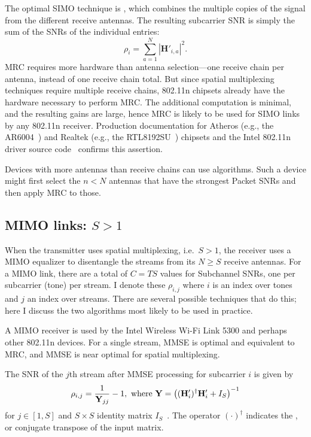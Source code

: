 The optimal SIMO technique is , which combines the multiple copies of the signal from the different receive antennas. The resulting subcarrier SNR is simply the sum of the SNRs of the individual entries:
\begin{equation}
	\label{eq:mrc}
	\rho_i = \sum_{a=1}^N \left| \mathbf{H}'_{i,a} \right|^2.
\end{equation}
MRC requires more hardware than antenna selection---one receive chain per antenna, instead of one receive chain total. But since spatial multiplexing techniques require multiple receive chains, 802.11n chipsets already have the hardware necessary to perform MRC. The additional computation is minimal, and the resulting gains are large, hence MRC is likely to be used for SIMO links by any 802.11n receiver. Production documentation for Atheros (e.g., the AR6004~\cite{ar6004}) and Realtek (e.g., the RTL8192SU~\cite{rtl8192su}) chipsets and the Intel 802.11n driver source code~\cite{iwlwifi} confirms this assertion.

Devices with more antennas than receive chains can use  algorithms. Such a device might first select the $n < N$ antennas that have the strongest Packet SNRs and then apply MRC to those.

\subsection{MIMO links: $S>1$}
When the transmitter uses spatial multiplexing, i.e.\ $S>1$, the receiver uses a MIMO equalizer to disentangle the streams from its $N\geq S$ receive antennas. For a MIMO link, there are a total of $C=TS$ values for Subchannel SNRs, one per subcarrier (tone) per stream. I denote these $\rho_{i,j}$ where $i$ is an index over tones and $j$ an index over streams. There are several possible techniques that do this; here I discuss the two algorithms most likely to be used in practice.

A  MIMO receiver is used by the Intel Wireless Wi-Fi Link 5300 and perhaps other 802.11n devices. For a single stream, MMSE is optimal and equivalent to MRC, and MMSE is near optimal for spatial multiplexing.

The SNR of the $j$th stream after MMSE processing for subcarrier $i$ is given by
\begin{equation}
\centering
\label{eq:mmse_snr}
\rho_{i,j} = \frac{1}{\mathbf{Y}_{jj}}-1, \text{ where }
\mathbf{Y} = \left((\mathbf{H}'_i)^\dagger \mathbf{H}'_i+I_S\right)^{-1}
\end{equation}
for $j \in [1,S]$ and $S\times S$ identity matrix $I_S$~\cite{Tse}. The operator $(\cdot)^\dagger$ indicates the , or conjugate transpose of the input matrix.

